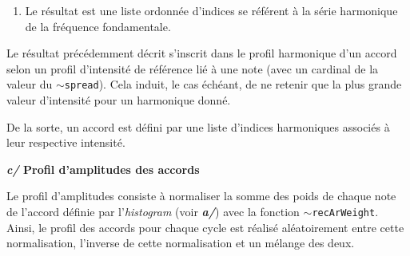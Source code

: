 \begin{enumerate}
 \begin{enumerate}
 \item Lister les diff\'erences en midi et en modulo 12 entre chaque harmonique d'une note donn\'ee et les harmoniques de la fr\'equence fondamentale.
 \item Lister les indices de la valeur minimal du r\'esultat pr\'ec\'edent.
 \item La fonction \texttt{$\sim$getNearestHarm} s\'electionne l'indice -- si il existe -- le plus pr\`es de la fr\'equence r\'eelle et n'appartenant pas encore au profil.
  \begin{lstlisting}[basicstyle=\footnotesize\ttfamily,language=Java]
~getNearestHarm = {
  |note, arIn, arRoot, arRef|
  var res, indexOrder, out;
  // 3.3.1.
  indexOrder=arIn.collect({|it| 
      (note-arRoot[it]).abs}).order;
  res=Array.fill(arIn.size,0);
  indexOrder.do({|it,i| res=res.put(it,arIn[i])});
  // 3.3.2.
  res.do({|item|
    if(arRef.includes(item),
        {out},
        {out=out.add(item)})});
  out.first;
 };\end{lstlisting}
 \color{black}
 \begin{enumerate}
 \item Ordonner les indices selon la proximit\'e de leur fr\'equence r\'eelle avec la fr\'equence fondamentale.
 \item Ajouter l'indice dont la fr\'equence est la plus proche dans le profil harmonique -- si l'indice n'est pas d\'ej\`a dans le profil.
 \end{enumerate}
 \end{enumerate}
 \item Le r\'esultat est une liste ordonn\'ee d'indices se r\'ef\'erent \`a la s\'erie harmonique de la fr\'equence fondamentale.
 \end{enumerate}

Le r\'esultat pr\'ec\'edemment d\'ecrit s'inscrit dans le profil harmonique d'un accord selon un profil d'intensit\'e de r\'ef\'erence li\'e \`a une note (avec un cardinal de la valeur du \texttt{$\sim$spread}). 
Cela induit, le cas \'ech\'eant, de ne retenir que la plus grande valeur d'intensit\'e pour un harmonique donn\'e.

De la sorte, un accord est d\'efini par une liste d'indices harmoniques associ\'es \`a leur respective intensit\'e.

   \bigskip

 \textbf{\textit{c/ } Profil d'amplitudes des accords }
  
  \smallskip
  Le profil d'amplitudes consiste \`a normaliser la somme des poids de chaque note de l'accord d\'efinie par l'\textsl{histogram} (voir \textbf{\textit{a/}}) avec la fonction \texttt{$\sim$recArWeight}. Ainsi, le profil des accords pour chaque cycle est r\'ealis\'e al\'eatoirement entre cette normalisation, l'inverse de cette normalisation et un m\'elange des deux.
  
